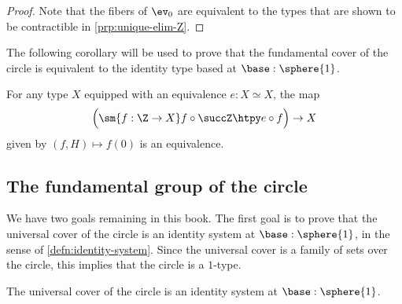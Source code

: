 \begin{proof}
  Note that the fibers of $\ev_0$ are equivalent to the types that are shown to be contractible in \cref{prp:unique-elim-Z}.
\end{proof}

The following corollary will be used to prove that the fundamental cover of the circle is equivalent to the identity type based at $\base:\sphere{1}$.

\begin{cor}\label{cor:universal-property-Z}
  For any type $X$ equipped with an equivalence $e:X\simeq X$, the map
  \begin{equation*}
    \Big(\sm{f:\Z\to X} f\circ \succZ \htpy e\circ f\Big)\to X
  \end{equation*}
  given by $(f,H)\mapsto f(0)$ is an equivalence.
\end{cor}

\subsection{The fundamental group of the circle}

We have two goals remaining in this book. The first goal is to prove that the universal cover of the circle is an identity system at $\base:\sphere{1}$, in the sense of \cref{defn:identity-system}. Since the universal cover is a family of sets over the circle, this implies that the circle is a $1$-type.

\begin{thm}
  \label{thm:eq-circle}%
  The universal cover of the circle is an identity system at $\base:\sphere{1}$.
\end{thm}

